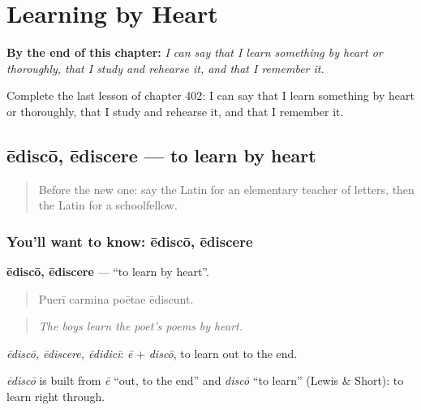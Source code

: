 
\chapter{Learning by Heart}
\label{ch:la-learning-by-heart}

\begin{chapteropening}
\textbf{By the end of this chapter:} \emph{I can say that I learn something by heart or thoroughly, that I study and rehearse it, and that I remember it.}

Complete the last lesson of chapter 402: I can say that I learn something by heart or thoroughly, that I study and rehearse it, and that I remember it.
\end{chapteropening}

\section[ēdiscō, ēdiscere]{ēdiscō, ēdiscere — to learn by heart}

\label{lesson:LA-C402-edisco}



\begin{quote}
Before the new one: say the Latin for an elementary teacher of letters, then the Latin for a schoolfellow.
\end{quote}

\subsection*{You'll want to know: ēdiscō, ēdiscere}
\textbf{ēdiscō, ēdiscere} — \textquotedblleft{}to learn by heart\textquotedblright{}.

\begin{quote}
Puerī carmina poētae ēdiscunt.
\end{quote}

\begin{quote}
\emph{The boys learn the poet's poems by heart.}
\end{quote}

\emph{ēdiscō, ēdiscere, ēdidicī}: \emph{ē} + \emph{discō}, to learn out to the end.

\begin{cousinweb}
\emph{ēdiscō} is built from \emph{ē} \textquotedblleft{}out, to the end\textquotedblright{} and \emph{discō} \textquotedblleft{}to learn\textquotedblright{} (Lewis \& Short): to learn right through.
\end{cousinweb}

